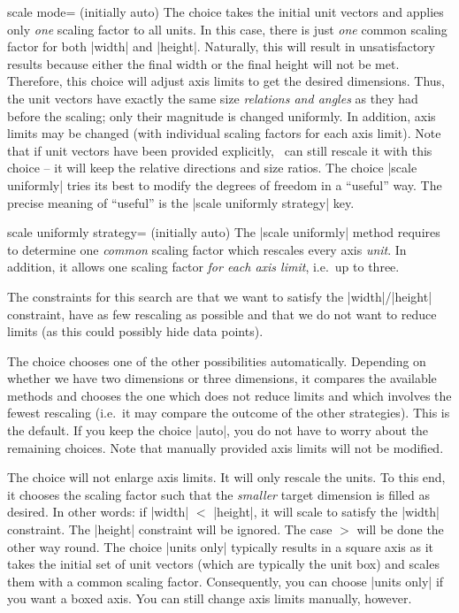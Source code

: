 \begin{pgfplotskey}{scale mode= (initially auto)}
	The choice  takes the initial unit vectors and applies only \emph{one} scaling factor to all units. In this case, there is just \emph{one} common scaling factor for both |width| and |height|. Naturally, this will result in unsatisfactory results because either the final width or the final height will not be met. Therefore, this choice will adjust axis limits to get the desired dimensions. Thus, the unit vectors have exactly the same size \emph{relations and angles} as they had before the scaling; only their magnitude is changed uniformly. In addition, axis limits may be changed (with individual scaling factors for each axis limit). Note that if unit vectors have been provided explicitly, \PGFPlots\ can still rescale it with this choice -- it will keep the relative directions and size ratios. The choice |scale uniformly| tries its best to modify the degrees of freedom in a ``useful'' way. The precise meaning of ``useful'' is the |scale uniformly strategy| key.

	\begin{pgfplotskey}{scale uniformly strategy= (initially auto)}
		The |scale uniformly| method requires to determine one \emph{common} scaling factor which rescales every axis \emph{unit}. In addition, it allows one scaling factor \emph{for each axis limit}, i.e.\ up to three.

		The constraints for this search are that we want to satisfy the |width|/|height| constraint, have as few rescaling as possible and that we do not want to reduce limits (as this could possibly hide data points).

		The choice  chooses one of the other possibilities automatically. Depending on whether we have two dimensions or three dimensions, it compares the available methods and chooses the one which does not reduce limits and which involves the fewest rescaling (i.e.\ it may compare the outcome of the other strategies). This is the default. If you keep the choice |auto|, you do not have to worry about the remaining choices. Note that manually provided axis limits will not be modified.

		The choice  will not enlarge axis limits. It will only rescale the units. To this end, it chooses the scaling factor such that the \emph{smaller} target dimension is filled as desired. In other words: if |width| $< $ |height|, it will scale to satisfy the |width| constraint. The |height| constraint will be ignored. The case $>$ will be done the other way round. The choice |units only| typically results in a square axis as it takes the initial set of unit vectors (which are typically the unit box) and scales them with a common scaling factor. Consequently, you can choose |units only| if you want a boxed axis. You can still change axis limits manually, however.


\end{pgfplotskey}
\end{pgfplotskey}
